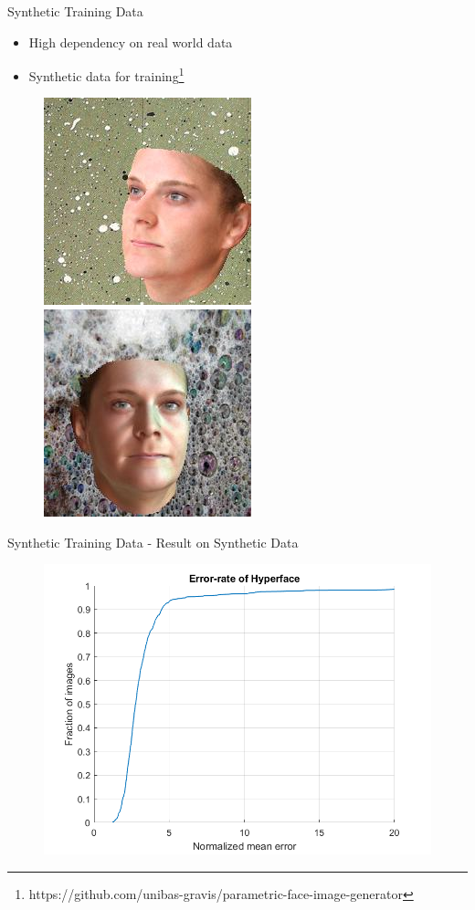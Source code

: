 \documentclass{beamer}
\begin{document}
\begin{frame}{Synthetic Training Data}

\begin{itemize}
\item High dependency on real world data
\item Synthetic data for training\footnote{https://github.com/unibas-gravis/parametric-face-image-generator}
\end{itemize}
\begin{figure}
\centering
\includegraphics[scale=0.45]{fig/13_0}
\includegraphics[scale=0.45]{fig/13_1}

\end{figure}

\end{frame}


\begin{frame}{Synthetic Training Data - Result on Synthetic Data}
\begin{figure}
\centering
\includegraphics[scale=0.45]{fig/error_rate_synth_synth}
\end{figure}
\end{frame}
\end{document}

